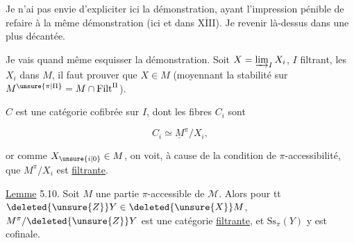 Je n'ai pas envie d'expliciter ici la démonstration, ayant l'impression pénible de refaire à  la même démonstration (ici et dans \uline{$\overline{\mathrm{XIII}}$}). Je  revenir là-dessus dans une  plus décantée.


Je vais quand même esquisser la démonstration. Soit $X=\varinjlim_I X_i$, $I$ filtrant, les $X_i$ dans $M$, il faut prouver que $X\in M$ (moyennant la  stabilité sur $M^{\unsure{\pi|\Pi}}=M\cap\mathrm{Filt}^{\Pi}$).


$C$ est une catégorie cofibrée sur $I$, dont les fibres $C_i$ sont

\[
 C_i\simeq\underline M^\pi/X_i,
\]

or comme $X_{\unsure{i|0}}\in M$, on voit, à cause de la condition de $\pi$-accessibilité, que $M^\pi/X_i$ est \uline{filtrante}.    

\margin{\rule{0.4pt}{1.4cm}}\uline{Lemme} 5.10. Soit $M$ une partie $\pi$-accessible de $\mathcal M$. Alors pour tt $\deleted{\unsure{Z}}Y\in\deleted{\unsure{X}}M$, $M^\pi/\deleted{\unsure{Z}}Y$ est une catégorie \uline{filtrante}, et $\mathrm{Ss}_\pi(Y)$ y est cofinale.


